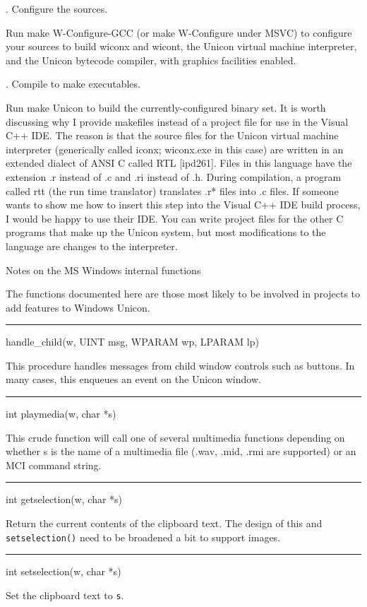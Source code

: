 {. Configure the sources.}


Run {\textquotedbl}make W-Configure-GCC{\textquotedbl} (or
{\textquotedbl}make W-Configure{\textquotedbl} under MSVC) to
configure your sources to build wiconx and wicont, the Unicon virtual
machine interpreter, and the Unicon bytecode compiler, with graphics
facilities enabled.

{. Compile to make executables.}


Run {\textquotedbl}make Unicon{\textquotedbl} to build the
currently-configured binary set. It is worth discussing why I provide
makefiles instead of a project file for use in the Visual C++ IDE.
The reason is that the source files for the Unicon virtual machine
interpreter (generically called iconx; wiconx.exe in this case) are
written in an extended dialect of ANSI C called RTL [ipd261]. Files in
this language have the extension .r instead of .c and .ri instead of
.h. During compilation, a program called rtt (the run time translator)
translates .r* files into .c files. If someone wants to show me how to
insert this step into the Visual C++ IDE build process, I would be
happy to use their IDE. You can write project files for the other C
programs that make up the Unicon system, but most modifications to the
language are changes to the interpreter.

{\sffamily
Notes on the MS Windows internal functions}


The functions documented here are those most likely to be involved in
projects to add features to Windows Unicon.

{\sffamily\bfseries
\bigskip\hrule\vspace{0.1cm}
\noindent
handle\_child(w, UINT msg, WPARAM wp, LPARAM lp)}


This procedure handles messages from child window controls such as
buttons. In many cases, this enqueues an event on the Unicon window.


{\sffamily\bfseries
\bigskip\hrule\vspace{0.1cm}
\noindent
int playmedia(w, char *s)}


This crude function will call one of several multimedia functions
depending on whether s is the name of a multimedia file (.wav, .mid,
.rmi are supported) or an MCI command string.


{\sffamily\bfseries
\bigskip\hrule\vspace{0.1cm}
\noindent
int getselection(w, char *s)}


Return the current contents of the clipboard text. The design of this
and \texttt{setselection()} need to be broadened a bit to support
images.


{\sffamily\bfseries
\bigskip\hrule\vspace{0.1cm}
\noindent
int setselection(w, char *s)}


Set the clipboard text to \texttt{s}.

